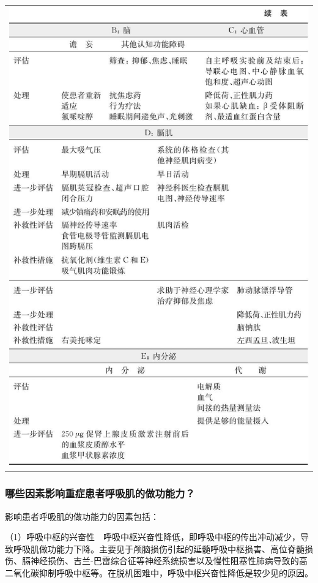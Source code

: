 \begin{longtable}{c}
\includegraphics[width=\textwidth,height=\textheight,keepaspectratio]{./images/Image00083.jpg}
\end{longtable}

\subsubsection{哪些因素影响重症患者呼吸肌的做功能力？}

影响患者呼吸肌的做功能力的因素包括：

（1）呼吸中枢的兴奋性　呼吸中枢兴奋性降低，即呼吸中枢的传出冲动减少，导致呼吸肌做功能力下降。主要见于颅脑损伤引起的延髓呼吸中枢损害、高位脊髓损伤、膈神经损伤、吉兰-巴雷综合征等神经系统损害以及慢性阻塞性肺病导致的高二氧化碳抑制呼吸中枢等。在脱机困难中，呼吸中枢兴奋性降低是较少见的原因。

